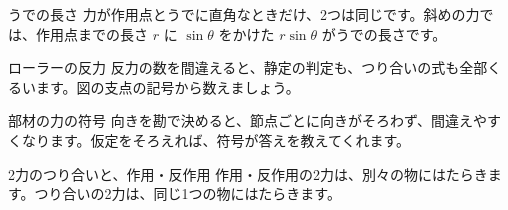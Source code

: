 \begin{tsumazuki}{うでの長さ}
力が作用点とうでに直角なときだけ、2つは同じです。斜めの力では、作用点までの長さ $r$ に $\sin\theta$ をかけた $r\sin\theta$ がうでの長さです。
\end{tsumazuki}

\begin{tsumazuki}{ローラーの反力}
反力の数を間違えると、静定の判定も、つり合いの式も全部くるいます。図の支点の記号から数えましょう。
\end{tsumazuki}

\begin{tsumazuki}{部材の力の符号}
向きを勘で決めると、節点ごとに向きがそろわず、間違えやすくなります。仮定をそろえれば、符号が答えを教えてくれます。
\end{tsumazuki}

\begin{tsumazuki}{2力のつり合いと、作用・反作用}
作用・反作用の2力は、別々の物にはたらきます。つり合いの2力は、同じ1つの物にはたらきます。
\end{tsumazuki}


